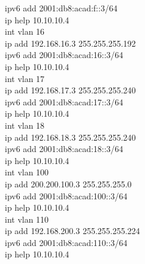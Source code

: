 \documentclass[12pt,a4paper]{report}
\begin{document}
{\hspace*{2cm}ipv6 add 2001:db8:acad:f::3/64\\
\hspace*{2cm}ip help 10.10.10.4\\
\hspace*{2cm}int vlan 16\\
\hspace*{2cm}ip add 192.168.16.3 255.255.255.192\\
\hspace*{2cm}ipv6 add 2001:db8:acad:16::3/64 \\
\hspace*{2cm}ip help 10.10.10.4\\
\hspace*{2cm}int vlan 17\\
\hspace*{2cm}ip add 192.168.17.3 255.255.255.240\\
\hspace*{2cm}ipv6 add 2001:db8:acad:17::3/64 \\
\hspace*{2cm}ip help 10.10.10.4\\
\hspace*{2cm}int vlan 18\\
\hspace*{2cm}ip add 192.168.18.3 255.255.255.240\\
\hspace*{2cm}ipv6 add 2001:db8:acad:18::3/64 \\
\hspace*{2cm}ip help 10.10.10.4\\
\hspace*{2cm}int vlan 100\\
\hspace*{2cm}ip add 200.200.100.3 255.255.255.0 \\
\hspace*{2cm}ipv6 add 2001:db8:acad:100::3/64 \\
\hspace*{2cm}ip help 10.10.10.4\\
\hspace*{2cm}int vlan 110\\
\hspace*{2cm}ip add 192.168.200.3 255.255.255.224 \\
\hspace*{2cm}ipv6 add 2001:db8:acad:110::3/64 \\
\hspace*{2cm}ip help 10.10.10.4\\
}
\end{document}
